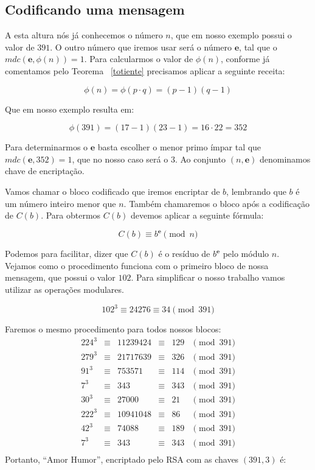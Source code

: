 \subsection{Codificando uma mensagem}

A esta altura n\'os j\'a conhecemos o n\'umero $n$, que em nosso exemplo possui o valor de $391$. O outro n\'umero que iremos usar ser\'a o número $\textbf{e}$, tal que o $mdc(\textbf{e}, \phi(n)) = 1$. Para calcularmos o valor de $\phi(n)$, conforme j\'a comentamos pelo Teorema ~\ref{totiente} precisamos aplicar a seguinte receita:

$$\phi(n) = \phi(p \cdot q) = (p-1)(q-1)$$

Que em nosso exemplo resulta em:

$$\phi(391) = (17 - 1)(23 - 1) = 16 \cdot 22 = 352$$

Para determinarmos o $\textbf{e}$ basta escolher o menor primo ímpar tal que $mdc(\textbf{e}, 352) = 1$, que no nosso caso ser\'a o $3$. Ao conjunto $(n, \textbf{e} )$ denominamos chave de encripta\c{c}\~ao.

Vamos chamar o bloco codificado que iremos encriptar de $b$, lembrando que $b$ \'e um n\'umero inteiro menor que $n$. Também chamaremos o bloco ap\'os a codifica\c{c}\~ao de $C(b)$. Para obtermos $C(b)$ devemos aplicar a seguinte f\'ormula:

$$C(b) \equiv b^\textbf{e} \pmod{n} $$

Podemos para facilitar, dizer que $C(b)$ \'e o res\'iduo de $b^\textbf{e}$ pelo m\'odulo $n$. Vejamos como o procedimento funciona com o primeiro bloco de nossa mensagem, que possui o valor $102$. Para simplificar o nosso trabalho vamos utilizar as opera\c{c}\~oes modulares.

$$102^3 \equiv 24276 \equiv 34 \pmod{391}$$

Faremos o mesmo procedimento para todos nossos blocos:
\[
\begin{array}{cccccc}
224^3& \equiv& 11239424& \equiv& 129& \pmod{391}\\
279^3& \equiv& 21717639& \equiv& 326& \pmod{391}\\
91^3&  \equiv& 753571&   \equiv& 114& \pmod{391}\\
7^3&   \equiv& 343&      \equiv& 343& \pmod{391}\\
30^3&  \equiv& 27000&    \equiv& 21&  \pmod{391}\\
222^3& \equiv& 10941048& \equiv& 86&  \pmod{391}\\
42^3&  \equiv& 74088&    \equiv& 189& \pmod{391}\\
7^3&   \equiv& 343&      \equiv& 343& \pmod{391}\\
\end{array}
\]
Portanto, ``Amor Humor'', encriptado pelo RSA com as chaves $(391 , 3)$ \'e: 

